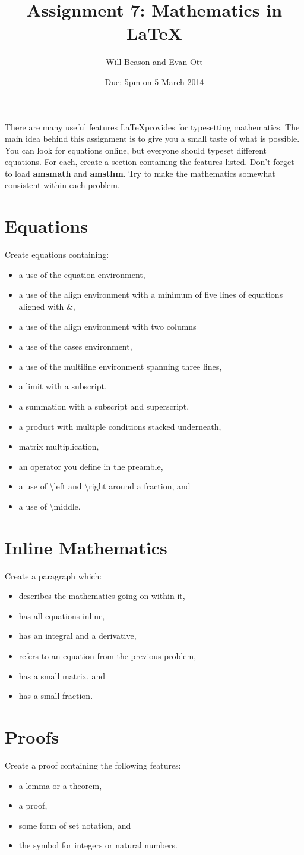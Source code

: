 \documentclass[a4paper,10pt]{article}
\title{\vspace{-1in} Assignment 7: Mathematics in \LaTeX}
\author{Will Beason and Evan Ott}
\date{Due: 5pm on 5 March 2014}
\begin{document}
\maketitle

There are many useful features \LaTeX provides for typesetting mathematics. The main idea behind this assignment is to give you a small taste of what is possible. You can look for equations online, but everyone should typeset different equations. For each, create a section containing the features listed. Don't forget to load \textbf{amsmath} and \textbf{amsthm}. Try to make the mathematics somewhat consistent within each problem.


\section{Equations}
Create equations containing:
\begin{itemize}
\item a use of the equation environment,
\item a use of the align environment with a minimum of five lines of equations aligned with \&,
\item a use of the align environment with two columns
\item a use of the cases environment,
\item a use of the multiline environment spanning three lines,
\item a limit with a subscript,
\item a summation with a subscript and superscript,
\item a product with multiple conditions stacked underneath,
\item matrix multiplication,
\item an operator you define in the preamble,
\item a use of \textbackslash left and \textbackslash right around a fraction, and
\item a use of \textbackslash middle.
\end{itemize}

\section{Inline Mathematics}

Create a paragraph which:
\begin{itemize}
\item describes the mathematics going on within it,
\item has all equations inline,
\item has an integral and a derivative,
\item refers to an equation from the previous problem,
\item has a small matrix, and
\item has a small fraction.
\end{itemize}

\section{Proofs}
Create a proof containing the following features:
\begin{itemize}
\item a lemma or a theorem,
\item a proof,
\item some form of set notation, and
\item the symbol for integers or natural numbers.
\end{itemize}
\end{document}
